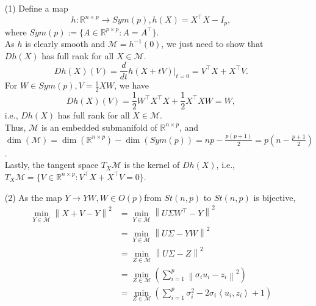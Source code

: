 \documentclass[en, oneside]{assignment}
\begin{document}
\begin{sol}
    \begin{itemize}
        \item[(1)] Define a map
        \begin{equation*}
            h: \mathbb{R}^{n \times p} \to Sym(p), h(X) = X^\top X - I_p,
        \end{equation*}
        where $Sym(p) := \{A \in \mathbb{R}^{p \times p}: A = A^\top\}$.\\
        As $h$ is clearly smooth and $\mathcal{M} = h^{-1}(0)$, we just need to show that $Dh(X)$ has full rank for all $X \in \mathcal{M}$.
        \begin{equation*}
            Dh(X)(V) = \frac{d}{dt} h(X + tV)|_{t=0} = V^\top X + X^\top V.
        \end{equation*}
        For $W \in Sym(p), V = \frac{1}{2}XW$, we have
        \begin{equation*}
            Dh(X)(V) = \frac{1}{2}W^\top X^\top X + \frac{1}{2}X^\top XW = W,
        \end{equation*}
        i.e., $Dh(X)$ has full rank for all $X \in \mathcal{M}$.\\
        Thus, $\mathcal{M}$ is an embedded submanifold of $\mathbb{R}^{n \times p}$, 
        and $\dim(\mathcal{M}) = \dim(\mathbb{R}^{n \times p}) - \dim(Sym(p)) = np - \frac{p(p+1)}{2} = p(n-\frac{p+1}{2})$.\\
        Lastly, the tangent space $T_X\mathcal{M}$ is the kernel of $Dh(X)$, i.e., $T_X\mathcal{M} = \{V \in \mathbb{R}^{n \times p}: V^\top X + X^\top V = 0\}$.
        \item[(2)] As the map $Y \to Y W, W \in O(p)$from $St(n, p)$ to $St(n, p)$ is bijective,
        \begin{align*}
            \min_{ Y \in \mathcal{M} } \left\lVert X + V - Y \right\rVert ^2 & = \min\limits_{ Y \in \mathcal{M} } \left\lVert U \Sigma W^{\top} - Y \right\rVert ^2\\
            & = \min_{ Y \in \mathcal{M} } \left\lVert U \Sigma - Y W \right\rVert ^2\\
            & = \min_{ Z \in \mathcal{M} } \left\lVert U \Sigma - Z \right\rVert ^2\\
            & = \min_{ Z \in \mathcal{M} } \left( \sum_{i = 1}^p \left\lVert \sigma_i u_i - z_i \right\rVert ^2 \right)\\
            & = \min_{ Z \in \mathcal{M} } \left( \sum_{i = 1}^p \sigma_i^2 - 2\sigma_i \left\langle u_i, z_i\right\rangle + 1 \right)\\

\end{align*}
\end{itemize}
\end{sol}
\end{document}
